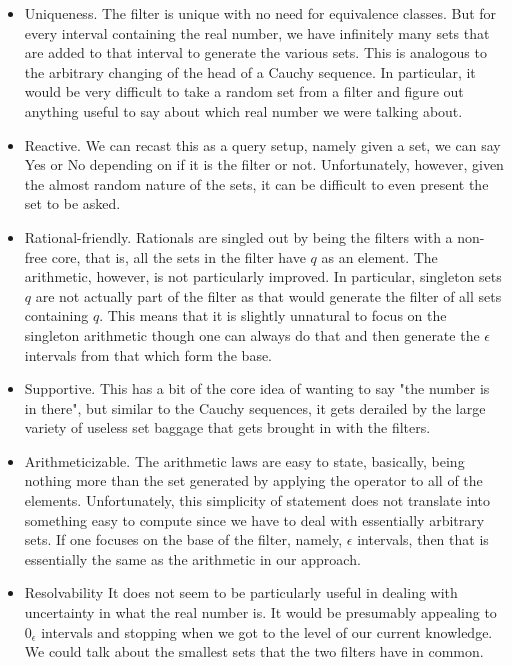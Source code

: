 \documentclass[12pt]{article}
\theoremstyle{remark}
\begin{document}
\begin{itemize}
    \item Uniqueness. The filter is unique with no need for equivalence classes. But for every interval containing the real number, we have infinitely many sets that are added to that interval to generate the various sets. This is analogous to the arbitrary changing of the head of a Cauchy sequence. In particular, it would be very difficult to take a random set from a filter and figure out anything useful to say about which real number we were talking about.
    \item Reactive. We can recast this as a query setup, namely given a set, we can say Yes or No depending on if it is the filter or not. Unfortunately, however, given the almost random nature of the sets, it can be difficult to even present the set to be asked. 
    \item Rational-friendly. Rationals are singled out by being the filters with a non-free core, that is, all the sets in the filter have $q$ as an element. The arithmetic, however, is not particularly improved. In particular, singleton sets $q$ are not actually part of the filter as that would generate the filter of all sets containing $q$. This means that it is slightly unnatural to focus on the singleton arithmetic though one can always do that and then generate the $\epsilon$ intervals from that which form the base. 
    \item Supportive. This has a bit of the core idea of wanting to say "the number is in there", but similar to the Cauchy sequences, it gets derailed by the large variety of useless set baggage that gets brought in with the filters. 
    \item Arithmeticizable. The arithmetic laws are easy to state, basically, being nothing more than the set generated by applying the operator to all of the elements. Unfortunately, this simplicity of statement does not translate into something easy to compute since we have to deal with essentially arbitrary sets. If one focuses on the base of the filter, namely, $\epsilon$ intervals, then that is essentially the same as the arithmetic in our approach. 
    \item Resolvability It does not seem to be particularly useful in dealing with uncertainty in what the real number is. It would be presumably appealing to $0_{\epsilon}$ intervals and stopping when we got to the level of our current knowledge. We could talk about the smallest sets that the two filters have in common. 
\end{itemize}
\end{document}

